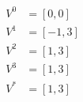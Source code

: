 

\begin{align*}
    V^0 &= [0,0] \\
    V^1 &= [-1,3] \\
    V^2 &= [1,3] \\
    V^3 &= [1,3] \\
    V^* &= [1,3]
\end{align*}
